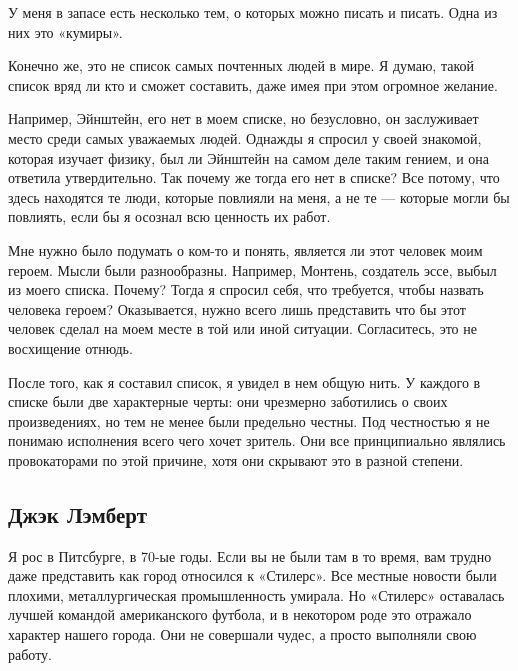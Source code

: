 \documentclass[ebook,12pt,oneside,openany]{memoir}
\begin{document}
\maketitle

У меня в запасе есть несколько тем, о которых можно писать и писать.
Одна из них это «кумиры». \newline

Конечно же, это не список самых почтенных людей в мире. Я думаю, такой
список вряд ли кто и сможет составить, даже имея при этом огромное
желание. \newline

Например, Эйнштейн, его нет в моем списке, но безусловно, он
заслуживает место среди самых уважаемых людей. Однажды я спросил у
своей знакомой, которая изучает физику, был ли Эйнштейн на самом деле
таким гением, и она ответила утвердительно. Так почему же тогда его
нет в списке? Все потому, что здесь находятся те люди, которые
повлияли на меня, а не те — которые могли бы повлиять, если бы я
осознал всю ценность их работ. \newline

Мне нужно было подумать о ком-то и понять, является ли этот человек
моим героем. Мысли были разнообразны. Например, Монтень, создатель
эссе, выбыл из моего списка. Почему? Тогда я спросил себя, что
требуется, чтобы назвать человека героем? Оказывается, нужно всего
лишь представить что бы этот человек сделал на моем месте в той или
иной ситуации. Согласитесь, это не восхищение отнюдь. \newline

После того, как я составил список, я увидел в нем общую нить. У
каждого в списке были две характерные черты: они чрезмерно заботились
о своих произведениях, но тем не менее были предельно честны. Под
честностью я не понимаю исполнения всего чего хочет зритель. Они все
принципиально являлись провокаторами по этой причине, хотя они
скрывают это в разной степени. \newline

\subsection{Джэк Лэмберт}

Я рос в Питсбурге, в 70-ые годы. Если вы не были там в то время, вам
трудно даже представить как город относился к «Стилерс». Все местные
новости были плохими, металлургическая промышленность умирала. Но
«Стилерс» оставалась лучшей командой американского футбола, и в
некотором роде это отражало характер нашего города. Они не совершали
чудес, а просто выполняли свою работу. \newline
\end{document}

